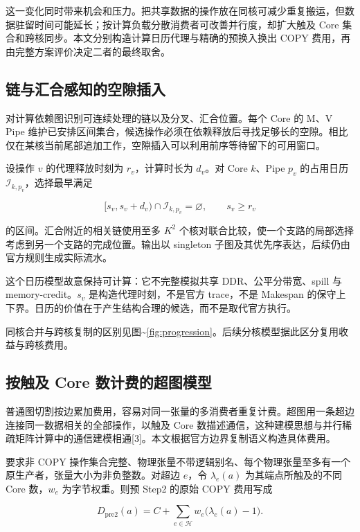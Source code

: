 \documentclass[anonymous,notoc]{gmcm2026}
\begin{document}
这一变化同时带来机会和压力。把共享数据的操作放在同核可减少重复搬运，但数据驻留时间可能延长；按计算负载分散消费者可改善并行度，却扩大触及 Core 集合和跨核同步。本文分别构造计算日历代理与精确的预换入换出 COPY 费用，再由完整方案评价决定二者的最终取舍。

\subsection{链与汇合感知的空隙插入}\label{ux94feux4e0eux6c47ux5408ux611fux77e5ux7684ux7a7aux9699ux63d2ux5165}

对计算依赖图识别可连续处理的链以及分叉、汇合位置。每个 Core 的 M、V Pipe 维护已安排区间集合，候选操作必须在依赖释放后寻找足够长的空隙。相比仅在某核当前尾部追加工作，空隙插入可以利用前序等待留下的可用窗口。

设操作 \(v\) 的代理释放时刻为 \(r_v\)，计算时长为 \(d_v\)。对 Core \(k\)、Pipe \(p_v\) 的占用日历 \(\mathcal I_{k,p_v}\)，选择最早满足

\[[s_v,s_v+d_v)\cap\mathcal I_{k,p_v}=\varnothing,\qquad s_v\ge r_v\]

的区间。汇合附近的相关链使用至多 \(K^2\) 个核对联合比较，使一个支路的局部选择考虑到另一个支路的完成位置。输出以 singleton 子图及其优先序表达，后续仍由官方规则生成实际流水。

这个日历模型故意保持可计算：它不完整模拟共享 DDR、公平分带宽、spill 与 memory-credit。\(s_v\) 是构造代理时刻，不是官方 trace，不是 Makespan 的保守上下界。日历的价值在于产生结构合理的候选，而不是取代官方执行。

同核合并与跨核复制的区别见图\textasciitilde{}\ref{fig:progression}。后续分核模型据此区分复用收益与跨核费用。

\subsection{按触及 Core 数计费的超图模型}\label{ux6309ux89e6ux53ca-core-ux6570ux8ba1ux8d39ux7684ux8d85ux56feux6a21ux578b}

普通图切割按边累加费用，容易对同一张量的多消费者重复计费。超图用一条超边连接同一数据相关的全部操作，以触及 Core 数描述通信，这种建模思想与并行稀疏矩阵计算中的通信建模相通{[}3{]}。本文根据官方边界复制语义构造具体费用。

要求非 COPY 操作集合完整、物理张量不带逻辑别名、每个物理张量至多有一个原生产者，张量大小为非负整数。对超边 \(e\)，令 \(\lambda_e(a)\) 为其端点所触及的不同 Core 数，\(w_e\) 为字节权重。则预 Step2 的原始 COPY 费用写成

\[D_{\mathrm{pre2}}(a)=C+\sum_{e\in\mathcal H}w_e\bigl(\lambda_e(a)-1\bigr).\]
\end{document}
